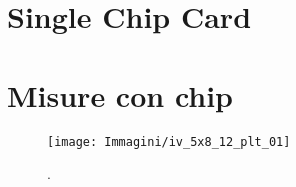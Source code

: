 \section{Single Chip Card}

\section{Misure con chip}
\begin{figure}
\centering
\texttt{[image: Immagini/iv\_5x8\_12\_plt\_01]}
\caption{.}
\label{iv_5x8_12_plt_01}
\end{figure}



